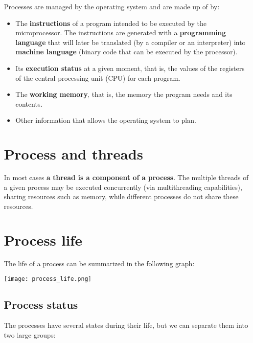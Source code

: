 Processes are managed by the operating system and are made up of by:

\begin{itemize}
    \item The \textbf{instructions} of a program intended to be executed by the microprocessor. The instructions are generated with a \textbf{programming language} that will later be translated (by a compiler or an interpreter) into \textbf{machine language} (binary code that can be executed by the processor).

    \item Its \textbf{execution status} at a given moment, that is, the values of the registers of the central processing unit (CPU) for each program.

    \item The \textbf{working memory}, that is, the memory the program needs  and its contents.

    \item Other information that allows the operating system to plan.
\end{itemize}

\section{Process and threads}
In most cases \textbf{a thread is a component of a process}. The multiple threads of a given process may be executed concurrently (via multithreading capabilities), sharing resources such as memory, while different processes do not share these resources.


\section{Process life}

The life of a process can be summarized in the following graph:

\begin{center}
    \texttt{[image: process\_life.png]}
\end{center}

\subsection{Process status}
The processes have several states during their life, but we can separate them into two large groups:

